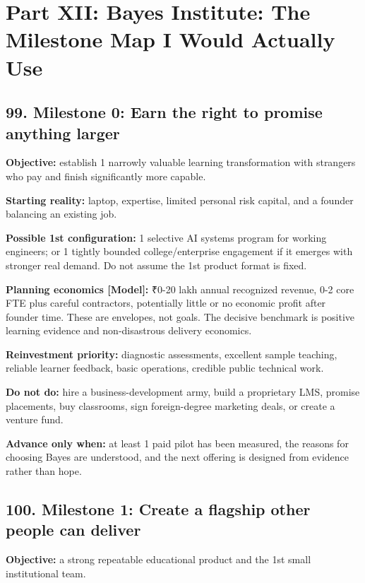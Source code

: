 
\section*{Part XII: Bayes Institute: The Milestone Map I Would Actually Use}

\subsection{99. Milestone 0: Earn the right to promise anything larger}

\textbf{Objective:} establish 1 narrowly valuable learning transformation with strangers who pay and finish significantly more capable.

\textbf{Starting reality:} laptop, expertise, limited personal risk capital, and a founder balancing an existing job.

\textbf{Possible 1st configuration:} 1 selective AI systems program for working engineers; or 1 tightly bounded college/\allowbreak enterprise engagement if it emerges with stronger real demand. Do not assume the 1st product format is fixed.

\textbf{Planning economics \textbf{[Model]}:} \textnormal{₹}0-20 lakh annual recognized revenue, 0-2 core FTE plus careful contractors, potentially little or no economic profit after founder time. These are envelopes, not goals. The decisive benchmark is positive learning evidence and non-disastrous delivery economics.

\textbf{Reinvestment priority:} diagnostic assessments, excellent sample teaching, reliable learner feedback, basic operations, credible public technical work.

\textbf{Do not do:} hire a business-development army, build a proprietary LMS, promise placements, buy classrooms, sign foreign-degree marketing deals, or create a venture fund.

\textbf{Advance only when:} at least 1 paid pilot has been measured, the reasons for choosing Bayes are understood, and the next offering is designed from evidence rather than hope.

\subsection{100. Milestone 1: Create a flagship other people can deliver}

\textbf{Objective:} a strong repeatable educational product and the 1st small institutional team.

